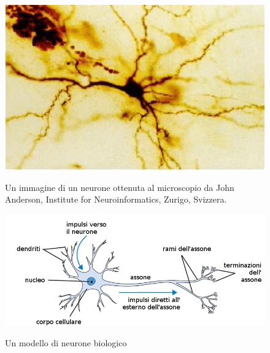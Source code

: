 \vspace{2 cm}

\begin{figure}[b]
\centering
{\includegraphics[scale=0.65]{media_tesi/real_neuron.png}}
\caption{Un immagine di un neurone ottenuta al microscopio da John Anderson, Institute for Neuroinformatics, Zurigo, Svizzera.}
\label{fig:subfig}
\end{figure}


\begin{figure}[h]
\centering
{\includegraphics[scale=0.55]{media_tesi/neuron_model.png}}
\caption{Un modello di neurone biologico}
\label{biologia-neuroni}
\end{figure}

%
%
%
%
%
%
%
\clearpage

